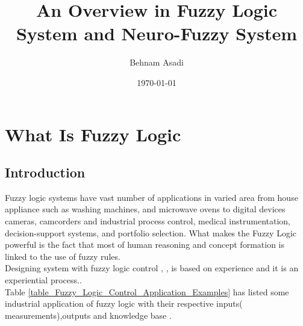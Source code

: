\documentclass{article}
\begin{document}
\setlength{\parindent}{0in}%
\author{Behnam Asadi}
\title{An Overview in Fuzzy Logic System and Neuro-Fuzzy System}
\date{\today}
\maketitle
\tableofcontents
%

\section{What Is Fuzzy Logic}\label{What Is Fuzzy Logic}
\subsection{Introduction}\label{Introduction}
Fuzzy logic systems have vast number of applications in varied area from house appliance 
such as washing machines, and microwave ovens to digital devices cameras, camcorders and  
industrial process control, medical instrumentation, decision-support systems, and portfolio selection.
What makes the Fuzzy Logic powerful is the fact that most of
human reasoning and concept formation is linked to the use of fuzzy rules. 
\\
Designing system with fuzzy logic control \cite{62215}, \cite{158640}, \cite{52552} is based on experience and it  is an experiential process.\cite{7735}.
\\
Table \ref{table_Fuzzy_Logic_Control_Application_Examples} has listed some industrial application of fuzzy logic with their respective inputs( measurements),outputs and knowledge base \cite{299142}.
\end{document}
